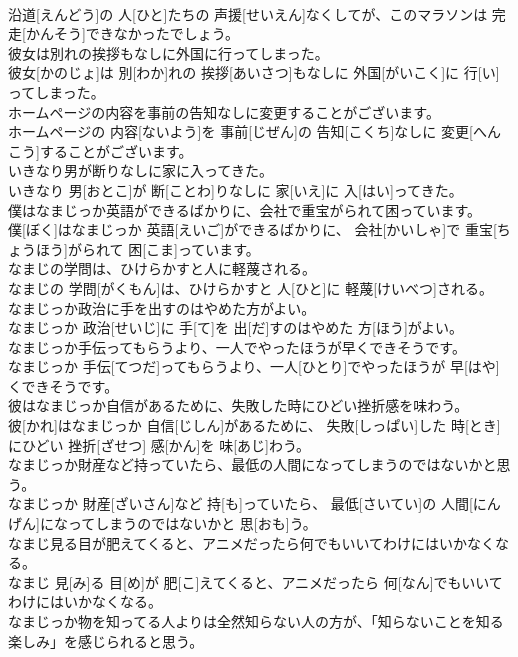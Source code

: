 \documentclass[8pt]{extreport}
\begin{document}
\begin{CJK}{UTF8}{min}
\\	沿道[えんどう]の 人[ひと]たちの 声援[せいえん]なくしてが、このマラソンは 完走[かんそう]できなかったでしょう。
\\	彼女は別れの挨拶もなしに外国に行ってしまった。	
\\	彼女[かのじょ]は 別[わか]れの 挨拶[あいさつ]もなしに 外国[がいこく]に 行[い]ってしまった。
\\	ホームページの内容を事前の告知なしに変更することがございます。	
\\	ホームページの 内容[ないよう]を 事前[じぜん]の 告知[こくち]なしに 変更[へんこう]することがございます。
\\	いきなり男が断りなしに家に入ってきた。	
\\	いきなり 男[おとこ]が 断[ことわ]りなしに 家[いえ]に 入[はい]ってきた。
\\	僕はなまじっか英語ができるばかりに、会社で重宝がられて困っています。	
\\	僕[ぼく]はなまじっか 英語[えいご]ができるばかりに、 会社[かいしゃ]で 重宝[ちょうほう]がられて 困[こま]っています。
\\	なまじの学問は、ひけらかすと人に軽蔑される。	
\\	なまじの 学問[がくもん]は、ひけらかすと 人[ひと]に 軽蔑[けいべつ]される。
\\	なまじっか政治に手を出すのはやめた方がよい。	
\\	なまじっか 政治[せいじ]に 手[て]を 出[だ]すのはやめた 方[ほう]がよい。
\\	なまじっか手伝ってもらうより、一人でやったほうが早くできそうです。	
\\	なまじっか 手伝[てつだ]ってもらうより、一人[ひとり]でやったほうが 早[はや]くできそうです。
\\	彼はなまじっか自信があるために、失敗した時にひどい挫折感を味わう。	
\\	彼[かれ]はなまじっか 自信[じしん]があるために、 失敗[しっぱい]した 時[とき]にひどい 挫折[ざせつ] 感[かん]を 味[あじ]わう。
\\	なまじっか財産など持っていたら、最低の人間になってしまうのではないかと思う。	
\\	なまじっか 財産[ざいさん]など 持[も]っていたら、 最低[さいてい]の 人間[にんげん]になってしまうのではないかと 思[おも]う。
\\	なまじ見る目が肥えてくると、アニメだったら何でもいいてわけにはいかなくなる。	
\\	なまじ 見[み]る 目[め]が 肥[こ]えてくると、アニメだったら 何[なん]でもいいてわけにはいかなくなる。
\\	なまじっか物を知ってる人よりは全然知らない人の方が、「知らないことを知る楽しみ」を感じられると思う。	

\end{CJK}
\end{document}
